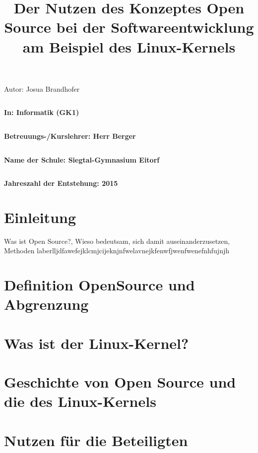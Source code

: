 \documentclass[a4paper,12pt]{article}
\title{Der Nutzen des Konzeptes Open Source bei der Softwareentwicklung am Beispiel des Linux-Kernels}
\date{}
\begin{document}
\maketitle
\thispagestyle{empty}
\begin{center}
  \LARGE Autor:    Josua Brandhofer
\end{center}
\begin{verbatim}
\end{verbatim}
\begin{center}
  \large\textbf{In:   Informatik (GK1)}
\end{center}
\begin{verbatim}
\end{verbatim}
\begin{center}
  \large\textbf{Betreuungs-/Kurslehrer:    Herr Berger}
\end{center}
\begin{verbatim}
\end{verbatim}
\begin{center}
  \large\textbf{Name der Schule:    Siegtal-Gymnasium Eitorf}
\end{center}
\begin{verbatim}
\end{verbatim}
\begin{center}
  \large\textbf{Jahreszahl der Entstehung:    2015}
\end{center}

\newpage
{}
\tableofcontents
\newpage
\section{Einleitung}
Was ist Open Source?, Wieso bedeutsam, sich damit auseinanderzusetzen, Methoden laberlljdfawefejklcmjcijeknjnfwelavnejkfenwfjwenfwenefnhfujnjh
\section{Definition OpenSource und Abgrenzung}
\section{Was ist der Linux-Kernel?}
\section{Geschichte von Open Source und die des Linux-Kernels}
\section{Nutzen für die Beteiligten}
\end{document}
